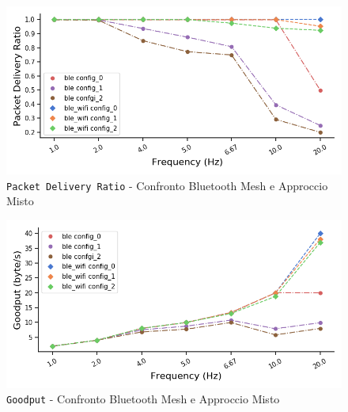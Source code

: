 \begin{figure}[hbt!]
    \centering
    \includegraphics[width = 1\textwidth]{images/graphs/mixed_pdr.png}
    \caption{\texttt{Packet Delivery Ratio} - Confronto Bluetooth Mesh e Approccio Misto}
    \label{graph:mixed_pdr}
\end{figure}

\begin{figure}[hbt!]
    \centering
    \includegraphics[width = 1\textwidth]{images/graphs/mixed_goodput.png}
    \caption{\texttt{Goodput} - Confronto Bluetooth Mesh e Approccio Misto}
    \label{graph:mixed_goodput}
\end{figure}

